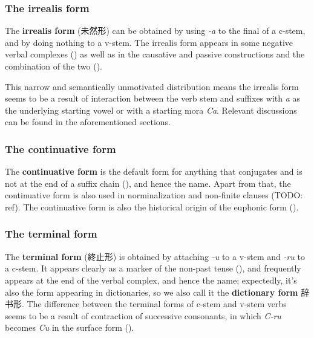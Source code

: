 \documentclass[UTF8, a4paper, oneside, scheme=plain]{ctexrep}
\newcommand*{\concept}[1]{\textbf{#1}}
\newcommand{\corpus}[1]{\emph{#1}}
\begin{document}
\subsubsection{The irrealis form}\label{sec:irrealis-form}

The \concept{irrealis form} (未然形) can be obtained by using \corpus{-a} to the final of a c-stem,
and by doing nothing to a v-stem.
The irrealis form appears in some negative verbal complexes ()
as well as in the causative and passive constructions 
and the combination of the two (). 

This narrow and semantically unmotivated distribution means 
the irrealis form seems to be a result of  
interaction between the verb stem and 
suffixes with \corpus{a} as the underlying starting vowel or with a starting mora \corpus{Ca}.
Relevant discussions can be found in the aforementioned sections.

\subsubsection{The continuative form}\label{sec:continuative-form}

The \concept{continuative form} is the default form for anything that conjugates
and is not at the end of a suffix chain (),
and hence the name.
Apart from that, the continuative form is also used in norminalization and non-finite clauses (TODO: ref).
The continuative form is also the historical origin of the euphonic form ().

\subsubsection{The terminal form}\label{sec:terminal-form}

The \concept{terminal form} (終止形) is obtained by attaching \corpus{-u} to a v-stem and \corpus{-ru} to a c-stem.
It appears clearly as a marker of the non-past tense (),
and frequently appears at the end of the verbal complex, and hence the name;
expectedly, it's also the form appearing in dictionaries,
so we also call it the \concept{dictionary form} 辞书形.
The difference between the terminal forms of c-stem and v-stem verbs 
seems to be a result of contraction of successive consonants,
in which \corpus{C-ru} becomes \corpus{Cu} in the surface form
().
\end{document}
